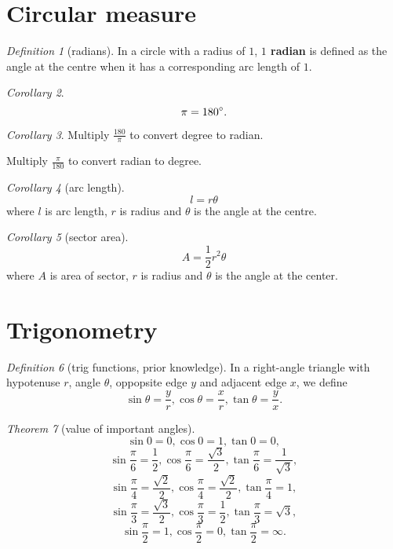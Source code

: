 \documentclass[8pt]{article}
\theoremstyle{remark}
\newtheorem{theorem}{Theorem}[section]
\newtheorem{corollary}[theorem]{Corollary}
\newtheorem{definition}[theorem]{Definition}
\begin{document}
    \section{Circular measure}
        \begin{definition}[radians]
            In a circle with a radius of $1$, \textbf{$1$ radian} is defined as the angle at the centre when it has a corresponding arc length of $1$.
        \end{definition}

        \begin{corollary}
            $$
                \pi = 180^\circ.
            $$
        \end{corollary}

        \begin{corollary}
            Multiply $\frac{180}{\pi}$ to convert degree to radian.
            
            Multiply $\frac{\pi}{180}$ to convert radian to degree.
        \end{corollary}

        \begin{corollary}[arc length]
            $$l = r \theta$$
            where $l$ is arc length, $r$ is radius and $\theta$ is the angle at the centre.
        \end{corollary}

        \begin{corollary}[sector area]
            $$A = \frac{1}{2} r^2 \theta$$
            where $A$ is area of sector, $r$ is radius and $\theta$ is the angle at the center.
        \end{corollary}

    \section{Trigonometry}
        
        \begin{definition}[trig functions, prior knowledge]
            In a right-angle triangle with hypotenuse $r$, angle $\theta$, oppopsite edge $y$ and adjacent edge $x$, we define
            $$
                \sin \theta = \frac{y}{r}, \cos \theta = \frac{x}{r}, \tan \theta = \frac{y}{x}.
            $$
        \end{definition}

        \begin{theorem}[value of important angles]
            $$\sin 0 = 0, \cos 0 = 1, \tan 0 = 0,$$
            $$\sin \frac{\pi}{6} = \frac{1}{2}, \cos \frac{\pi}{6} = \frac{\sqrt{3}}{2}, \tan \frac{\pi}{6} = \frac{1}{\sqrt{3}},$$
            $$\sin \frac{\pi}{4} = \frac{\sqrt{2}}{2}, \cos \frac{\pi}{4} = \frac{\sqrt{2}}{2}, \tan \frac{\pi}{4} = 1,$$
            $$\sin \frac{\pi}{3} = \frac{\sqrt{3}}{2}, \cos \frac{\pi}{3} = \frac{1}{2}, \tan \frac{\pi}{3} = \sqrt{3},$$
            $$\sin \frac{\pi}{2} = 1, \cos \frac{\pi}{2} = 0, \tan \frac{\pi}{2} = \infty.$$
        \end{theorem}
\end{document}
